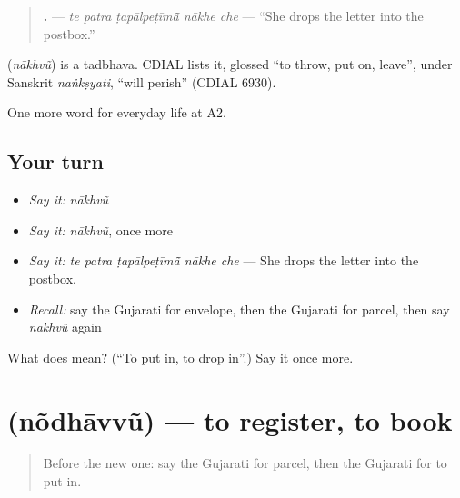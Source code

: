 \begin{quote}
\textbf{    .} — \emph{te patra ṭapālpeṭīmā̃ nākhe che} — \textquotedblleft{}She drops the letter into the postbox.\textquotedblright{}
\end{quote}

\begin{cousinweb}
\textbf{} (\emph{nākhvũ}) is a tadbhava. CDIAL lists it, glossed \textquotedblleft{}to throw, put on, leave\textquotedblright{}, under Sanskrit \emph{naṅkṣyati}, \textquotedblleft{}will perish\textquotedblright{} (CDIAL 6930).
\end{cousinweb}

\begin{grammarlens}[title={What you've built}]
One more word for everyday life at A2.
\end{grammarlens}

\subsection*{Your turn}
\begin{itemize}
\raggedright
  \item \emph{Say it:} \emph{nākhvũ}
  \item \emph{Say it:} \emph{nākhvũ}, once more
  \item \emph{Say it:} \emph{te patra ṭapālpeṭīmā̃ nākhe che} — She drops the letter into the postbox.
  \item \emph{Recall:} say the Gujarati for envelope, then the Gujarati for parcel, then say \emph{nākhvũ} again
\end{itemize}

\begin{tcolorbox}[breakable,colback=teal!4,colframe=teal!35!black,title={Before you move on}]
What does  mean? (\textquotedblleft{}To put in, to drop in\textquotedblright{}.) Say it once more.
\end{tcolorbox}
\section[\texorpdfstring{\gu{નોંધાવવું} (nõdhāvvũ)}{નોંધાવવું (nõdhāvvũ)}]{ (nõdhāvvũ) — to register, to book}

\label{lesson:GU-C200-nondhavvu}



\begin{quote}
Before the new one: say the Gujarati for parcel, then the Gujarati for to put in.
\end{quote}

